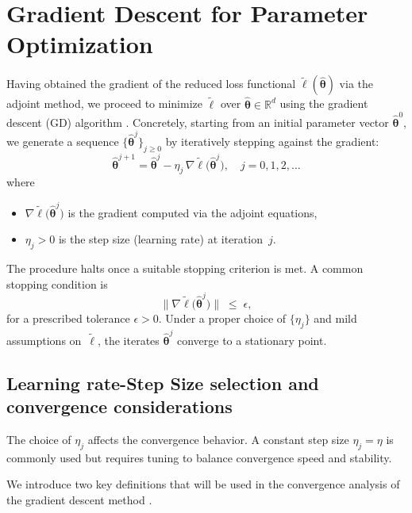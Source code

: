 \section{Gradient Descent for Parameter Optimization}
\label{sec:gd_opt}

Having obtained the gradient of the reduced loss functional $\tilde\ell(\hat{\bm\theta})$ via the adjoint method, we proceed to minimize $\tilde\ell$ over $\hat{\bm\theta}\in\mathbb{R}^d$ using the gradient descent (GD) algorithm \cite{ruder2017overviewgradientdescentoptimization,SENGUPTA2014521}.  Concretely, starting from an initial parameter vector $\hat{\bm\theta}^0$, we generate a sequence $\{\hat{\bm\theta}^j\}_{j\ge0}$ by iteratively stepping against the gradient:\\
\begin{equation}
    \hat{\bm\theta}^{j+1}
    = \hat{\bm\theta}^j
    - \eta_j \,\nabla \tilde\ell\bigl(\hat{\bm\theta}^j\bigr),
    \quad j = 0,1,2,\dots
    \label{eq:gd_update}
\end{equation}
where
\begin{itemize}
  \item $\nabla \tilde\ell\bigl(\hat{\bm\theta}^j\bigr)$ is the gradient computed via the adjoint equations,
  \item $\eta_j>0$ is the step size (learning rate) at iteration~$j$.
\end{itemize}
The procedure halts once a suitable stopping criterion is met. A common stopping condition is\\
\begin{equation}
    \|\nabla \tilde\ell\bigl(\hat{\bm\theta}^j\bigr)\|\;\le\;\epsilon,
    \label{eq:gd_stop}
\end{equation}
for a prescribed tolerance $\epsilon>0$.  Under a proper choice of $\{\eta_j\}$ and mild assumptions on~$\tilde\ell$, the iterates $\hat{\bm\theta}^j$ converge to a stationary point.

\subsection*{Learning rate-Step Size selection and convergence considerations}

The choice of $ \eta_j $ affects the convergence behavior. A constant step size $ \eta_j = \eta $ is commonly used but requires tuning to balance convergence speed and stability.

We introduce two key definitions that will be used in the convergence analysis of the gradient descent method \cite{garrigos2023handbook}.

